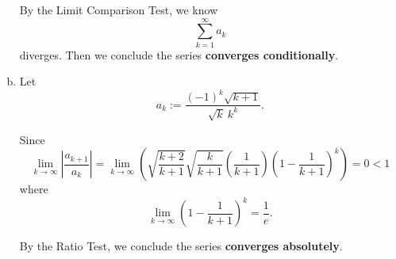 \begin{Exercise}
\begin{enumerate}[a)]
\begin{solution}
By the Limit Comparison Test, we know 
$$
\sum_{k=1}^{\infty}a_k
$$ 
diverges. Then we conclude the series \textbf{converges conditionally}.
\end{solution}

\item
\begin{solution}
Let 
$$
a_k := \frac{(-1)^k\sqrt{k+1}}{\sqrt{k}\ k^k}.
$$

Since
$$
\lim_{k\to\infty}\left|\frac{a_{k+1}}{a_k}\right| 
= \lim_{k\to\infty}\left(\sqrt{\frac{k+2}{k+1}}\sqrt{\frac{k}{k+1}}\left(\frac{1}{k+1}\right)\left(1-\frac{1}{k+1}\right)^k\right) 
= 0 
< 1
$$
where 
$$
\lim_{k\to\infty}\left(1-\frac{1}{k+1}\right)^k 
= \frac{1}{e}.
$$

By the Ratio Test, we conclude the series \textbf{converges absolutely}.
\end{solution}
\end{enumerate}
\end{Exercise}